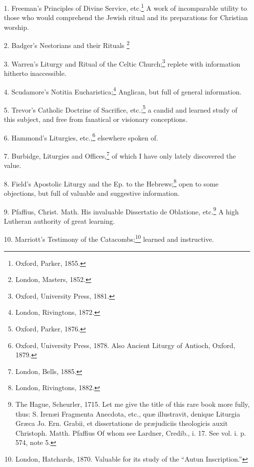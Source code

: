 1. Freeman’s Principles of Divine Service, etc.\footnote{\par  Oxford, Parker, 1855.} A work of incomparable utility to those who would comprehend the Jewish ritual and its preparations for Christian worship.

2. Badger’s Nestorians and their Rituals \footnote{\par  London, Masters, 1852.}

3. Warren’s Liturgy and Ritual of the Celtic Church;\footnote{\par  Oxford, University Press, 1881.} replete with information hitherto inaccessible.

4. Scudamore’s Notitia Eucharistica;\footnote{\par  London, Rivingtons, 1872.} Anglican, but full of general information.

5. Trevor’s Catholic Doctrine of Sacrifice, etc.;\footnote{\par  Oxford, Parker, 1876.} a candid and learned study of this subject, and free from fanatical or visionary conceptions.

6. Hammond’s Liturgies, etc.,\footnote{\par  Oxford, University Press, 1878. Also Ancient Liturgy of Antioch, Oxford, 1879.} elsewhere spoken of.

7. Burbidge, Liturgies and Offices,\footnote{\par  London, Bells, 1885.} of which I have only lately discovered the value.

8. Field’s Apostolic Liturgy and the Ep. to the Hebrews;\footnote{\par  London, Rivingtons, 1882.} open to some objections, but full of valuable and suggestive information.

9. Pfaffius, Christ. Math. His invaluable Dissertatio de Oblatione, etc.\footnote{\par  The Hague, Scheurler, 1715. Let me give the title of this rare book more fully, thus: S. Irenæi Fragmenta Anecdota, etc., quæ illustravit, denique Liturgia Græca Jo. Ern. Grabii, et dissertatione de præjudiciis theologicis auxit Christoph. Matth. Pfaffius Of whom see Lardner, Credib., i. 17. See vol. i. p. 574, note 5.} A high Lutheran authority of great learning.

10. Marriott’s Testimony of the Catacombs;\footnote{\par  London, Hatchards, 1870. Valuable for its study of the “Autun Inscription.”} learned and instructive.

